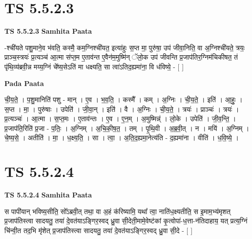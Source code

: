 \documentclass[17pt]{extarticle}
\begin{document}

\section{ TS 5.5.2.3 }

\textbf{TS 5.5.2.3 } \newline
\textbf{Samhita Paata} \newline

-श्ची॑यते पशु॒माने॒व भ॑वति॒ कस्मै॒ कम॒ग्निश्ची॑यत॒ इत्या॑हुः स॒प्त मा॒ पुरु॑षा॒ उप॑ जीवा॒निति॒ वा अ॒ग्निश्ची॑यते॒ त्रयः॒ प्राञ्च॒स्त्रयः॑ प्र॒त्यञ्च॑ आ॒त्मा स॑प्त॒म ए॒ताव॑न्त ए॒वैन॑म॒मुष्मि॑न् ॅलो॒क उप॑ जीवन्ति प्र॒जाप॑तिर॒ग्निम॑चिकीषत॒ तं पृ॑थि॒व्य॑ब्रवी॒न्न मय्य॒ग्निं चे᳚ष्य॒सेऽति॑ मा धक्ष्यति॒ सा त्वा॑ऽतिद॒ह्यमा॑ना॒ वि ध॑विष्ये॒ - [  ] \newline

\textbf{Pada Paata} \newline

ची॒य॒ते॒ । प॒शु॒मानिति॑ पशु - मान् । ए॒व । भ॒व॒ति॒ । कस्मै᳚ । कम् । अ॒ग्निः । ची॒य॒ते॒ । इति॑ । आ॒हुः॒ । स॒प्त । मा॒ । पुरु॑षाः । उपेति॑ । जी॒वा॒न् । इति॑ । वै । अ॒ग्निः । ची॒य॒ते॒ । त्रयः॑ । प्राञ्चः॑ । त्रयः॑ । प्र॒त्यञ्चः॑ । आ॒त्मा । स॒प्त॒मः । ए॒ताव॑न्तः । ए॒व । ए॒न॒म् । अ॒मुष्मिन्न्॑ । लो॒के । उपेति॑ । जी॒व॒न्ति॒ । प्र॒जाप॑ति॒रिति॑ प्र॒जा - प॒तिः॒ । अ॒ग्निम् । अ॒चि॒की॒ष॒त॒ । तम् । पृ॒थि॒वी । अ॒ब्र॒वी॒त् । न । मयि॑ । अ॒ग्निम् । चे॒ष्य॒से॒ । अतीति॑ । मा॒ । ध॒क्ष्य॒ति॒ । सा । त्वा॒ । अ॒ति॒द॒ह्यमा॒नेत्य॑ति - द॒ह्यमा॑ना । वीति॑ । ध॒वि॒ष्ये॒ ।  \newline





\section{ TS 5.5.2.4 }

\textbf{TS 5.5.2.4 } \newline
\textbf{Samhita Paata} \newline

स पापी॑यान् भविष्य॒सीति॒ सो᳚ऽब्रवी॒त् तथा॒ वा अ॒हं क॑रिष्यामि॒ यथा᳚ त्वा॒ नाति॑ध॒क्ष्यतीति॒ स इ॒माम॒भ्य॑मृशत् प्र॒जाप॑तिस्त्वा सादयतु॒ तया॑ दे॒वत॑याऽङ्गिर॒स्वद् ध्रु॒वा सी॒देती॒मामे॒वेष्ट॑कां कृ॒त्वोपा॑-ध॒त्ता-न॑तिदाहाय॒ यत् प्रत्य॒ग्निं चि॑न्वी॒त तद॒भि मृ॑शेत् प्र॒जाप॑तिस्त्वा सादयतु॒ तया॑ दे॒वत॑याऽङ्गिर॒स्वद् ध्रु॒वा सी॒दे - [  ] \newline
\end{document}
